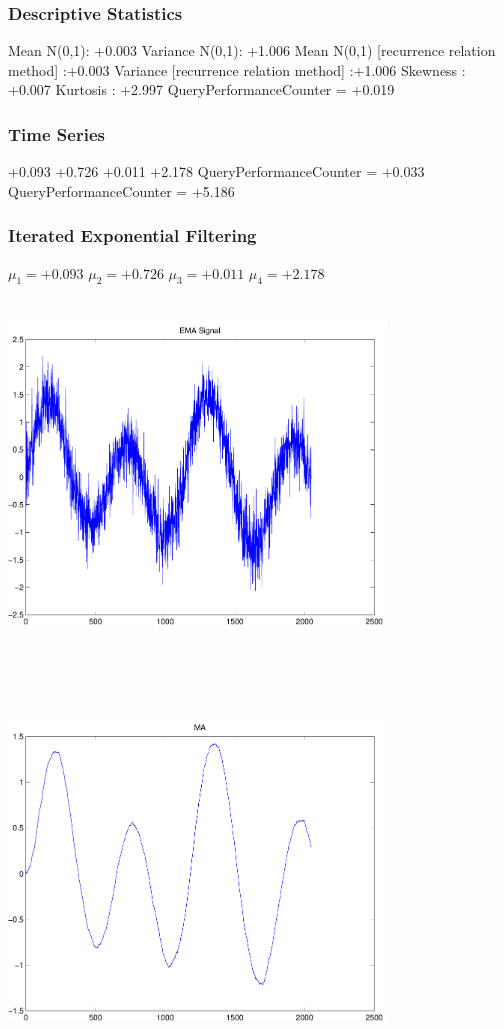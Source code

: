 \documentclass[9pt]{article}
\theoremstyle{plain}
\theoremstyle{definition}
\theoremstyle{remark}
\numberwithin{equation}{section}
\begin{document}
\subsubsection{Descriptive Statistics}
Mean N(0,1): +0.003
Variance N(0,1): +1.006
Mean N(0,1) [recurrence relation method] :+0.003
Variance [recurrence relation method] :+1.006
Skewness : +0.007
Kurtosis : +2.997
QueryPerformanceCounter  =  +0.019
\subsubsection{Time Series }
+0.093
+0.726
+0.011
+2.178
QueryPerformanceCounter  =  +0.033
QueryPerformanceCounter  =  +5.186
\subsubsection{Iterated Exponential Filtering }
$\mu_1 =+0.093$
$\mu_2 =+0.726$
$\mu_3 =+0.011$
$\mu_4 =+2.178$
\includegraphics[width=10.0cm,height=10.0cm]{EMA_signal.pdf}

\includegraphics[width=10.0cm,height=10.0cm]{MA.pdf}
\end{document}
